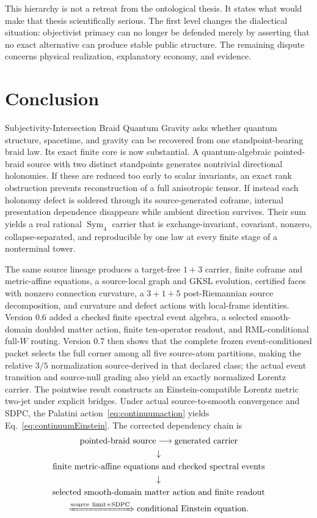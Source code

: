 \documentclass[11pt]{article}
\theoremstyle{definition}
\theoremstyle{remark}
\newcommand{\Sym}{\operatorname{Sym}}
\begin{document}
This hierarchy is not a retreat from the ontological thesis. It states what would make that thesis scientifically serious. The first level changes the dialectical situation: objectivist primacy can no longer be defended merely by asserting that no exact alternative can produce stable public structure. The remaining dispute concerns physical realization, explanatory economy, and evidence.

\section{Conclusion}

Subjectivity-Intersection Braid Quantum Gravity asks whether quantum structure, spacetime, and gravity can be recovered from one standpoint-bearing braid law. Its exact finite core is now substantial. A quantum-algebraic pointed-braid source with two distinct standpoints generates nontrivial directional holonomies. If these are reduced too early to scalar invariants, an exact rank obstruction prevents reconstruction of a full anisotropic tensor. If instead each holonomy defect is soldered through its source-generated coframe, internal presentation dependence disappears while ambient direction survives. Their sum yields a real rational $\Sym_4$ carrier that is exchange-invariant, covariant, nonzero, collapse-separated, and reproducible by one law at every finite stage of a nonterminal tower.

The same source lineage produces a target-free $1+3$ carrier, finite coframe and metric-affine equations, a source-local graph and GKSL evolution, certified faces with nonzero connection curvature, a $3+1+5$ post-Riemannian source decomposition, and curvature and defect actions with local-frame identities. Version 0.6 added a checked finite spectral event algebra, a selected smooth-domain doubled matter action, finite ten-operator readout, and RML-conditional full-$W$ routing. Version 0.7 then shows that the complete frozen event-conditioned packet selects the full corner among all five source-atom partitions, making the relative $3/5$ normalization source-derived in that declared class; the actual event transition and source-null grading also yield an exactly normalized Lorentz carrier. The pointwise result constructs an Einstein-compatible Lorentz metric two-jet under explicit bridges. Under actual source-to-smooth convergence and SDPC, the Palatini action~\eqref{eq:continuumaction} yields Eq.~\eqref{eq:continuumEinstein}. The corrected dependency chain is
\[
 \begin{gathered}
 \text{pointed-braid source}\longrightarrow\text{generated carrier}\\
 \downarrow\\
 \text{finite metric-affine equations and checked spectral events}\\
 \downarrow\\
 \text{selected smooth-domain matter action and finite readout}\\
 \xRightarrow{\mathrm{source\ limit+SDPC}}\text{conditional Einstein equation}.
 \end{gathered}
\]
\end{document}
